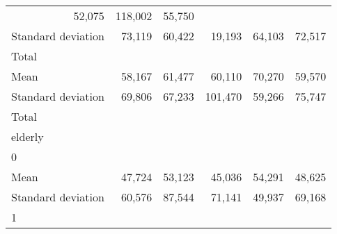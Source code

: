 \begin{tabular}{llllll}
  \multicolumn{1}{r}{52,075} &
  \multicolumn{1}{r}{118,002} &
  \multicolumn{1}{r}{55,750} \\
\multicolumn{1}{l}{\hspace{4em}Standard deviation} &
  \multicolumn{1}{|r}{73,119} &
  \multicolumn{1}{r}{60,422} &
  \multicolumn{1}{r}{19,193} &
  \multicolumn{1}{r}{64,103} &
  \multicolumn{1}{r}{72,517} \\
\multicolumn{1}{l}{\hspace{3em}Total} &
  \multicolumn{1}{|r}{} &
  \multicolumn{1}{r}{} &
  \multicolumn{1}{r}{} &
  \multicolumn{1}{r}{} &
  \multicolumn{1}{r}{} \\
\multicolumn{1}{l}{\hspace{4em}Mean} &
  \multicolumn{1}{|r}{58,167} &
  \multicolumn{1}{r}{61,477} &
  \multicolumn{1}{r}{60,110} &
  \multicolumn{1}{r}{70,270} &
  \multicolumn{1}{r}{59,570} \\
\multicolumn{1}{l}{\hspace{4em}Standard deviation} &
  \multicolumn{1}{|r}{69,806} &
  \multicolumn{1}{r}{67,233} &
  \multicolumn{1}{r}{101,470} &
  \multicolumn{1}{r}{59,266} &
  \multicolumn{1}{r}{75,747} \\
\multicolumn{1}{l}{\hspace{1em}Total} &
  \multicolumn{1}{|r}{} &
  \multicolumn{1}{r}{} &
  \multicolumn{1}{r}{} &
  \multicolumn{1}{r}{} &
  \multicolumn{1}{r}{} \\
\multicolumn{1}{l}{\hspace{2em}elderly} &
  \multicolumn{1}{|r}{} &
  \multicolumn{1}{r}{} &
  \multicolumn{1}{r}{} &
  \multicolumn{1}{r}{} &
  \multicolumn{1}{r}{} \\
\multicolumn{1}{l}{\hspace{3em}0} &
  \multicolumn{1}{|r}{} &
  \multicolumn{1}{r}{} &
  \multicolumn{1}{r}{} &
  \multicolumn{1}{r}{} &
  \multicolumn{1}{r}{} \\
\multicolumn{1}{l}{\hspace{4em}Mean} &
  \multicolumn{1}{|r}{47,724} &
  \multicolumn{1}{r}{53,123} &
  \multicolumn{1}{r}{45,036} &
  \multicolumn{1}{r}{54,291} &
  \multicolumn{1}{r}{48,625} \\
\multicolumn{1}{l}{\hspace{4em}Standard deviation} &
  \multicolumn{1}{|r}{60,576} &
  \multicolumn{1}{r}{87,544} &
  \multicolumn{1}{r}{71,141} &
  \multicolumn{1}{r}{49,937} &
  \multicolumn{1}{r}{69,168} \\
\multicolumn{1}{l}{\hspace{3em}1} &

\end{tabular}
